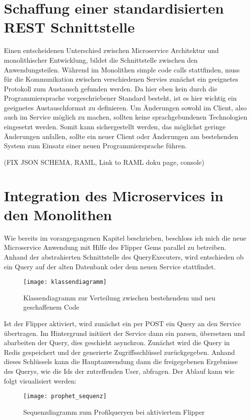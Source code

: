 \section{Schaffung einer standardisierten REST Schnittstelle}
Einen entscheidenen Unterschied zwischen Microservice Architektur und monolithischer Entwicklung, bildet die Schnittstelle zwischen den Anwendungsteilen. Während im Monolithen simple code calls stattfinden, muss für die Kommunikation zwischen verschiedenen Servies zunächst ein geeignetes Protokoll zum Austausch gefunden werden.
Da hier eben kein durch die Programmiersprache vorgeschriebener Standard besteht, ist es hier wichtig ein geeignetes Austauschformat zu definieren.
Um Änderungen sowohl im Client, also auch im Service möglich zu machen, sollten keine sprachgebundenen Technologien eingesetzt werden. Somit kann sichergestellt werden, das möglichst geringe Änderungen anfallen, sollte ein neuer Client oder Änderungen am bestehenden System zum Einsatz einer neuen Programmiersprache führen.

(FIX JSON SCHEMA, RAML, Link to RAML doku page, console)

\section{Integration des Microservices in den Monolithen}
Wie bereits im vorangegangenen Kapitel beschrieben, beschloss ich mich die neue Microservice Anwendung mit Hilfe des Flipper Gems parallel zu betreiben. Anhand der abstrahierten Schnittstelle des QueryExecuters, wird entschieden ob ein Query auf der alten Datenbank oder dem neuen Service stattfindet.
\begin{figure}[h]
    \centering
    \caption{Klassendiagramm zur Verteilung zwischen bestehendem und neu geschaffenem Code}
    \texttt{[image: klassendiagramm]}
\end{figure}

Ist der Flipper aktiviert, wird zunächst ein per POST ein Query an den Service übertragen. Im Hintergrund initiiert der Service dann ein parsen, übersetzen und abarbeiten der Query, dies geschieht asynchron. Zunächst wird die Query in Redis gespeichert und der generierte Zugriffsschlüssel zurückgegeben.
Anhand dieses Schlüssels kann die Hauptanwendung dann die freigegebenen Ergebnisse des Querys, wie die Ids der zutreffenden User, abfragen. Der Ablauf kann wie folgt visualisiert werden:

\begin{figure}[h]
    \centering
    \caption{Sequenzdiagramm zum Profilqueryen bei aktiviertem Flipper}
    \texttt{[image: prophet\_sequenz]}
\end{figure}

